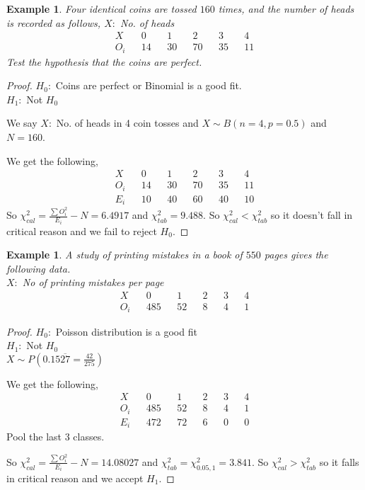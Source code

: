 \documentclass[oneside,11pt,pdftex]{book}%
\numberwithin{equation}{section}
\newtheorem{example}[theorem]{Example}
\numberwithin{section}{chapter}
\numberwithin{equation}{chapter}
\begin{document}
\begin{example}
	Four identical coins are tossed $ 160 $ times, and the number of heads is recorded as follows,
	$ X: $ No. of heads
	\begin{align*}
		X && 0 && 1 && 2 && 3 && 4\\
		O_i && 14 && 30 && 70 && 35 && 11
	\end{align*}
	Test the hypothesis that the coins are perfect.
\end{example}
\begin{proof}
	$ H_0: $ Coins are perfect or Binomial is a good fit.\\
	$ H_1: $ Not $ H_0 $
	
	We say $ X: $ No. of heads in 4 coin tosses and $ X \sim B(n=4,p=0.5) $ and $ N=160 $.
	
	We get the following,
	\begin{align*}
		X && 0 && 1 && 2 && 3 && 4\\
		O_i && 14 && 30 && 70 && 35 && 11\\
		E_i && 10 && 40 && 60 && 40 && 10
	\end{align*}
	So $ \chi^2_{cal} = \frac{\sum O_i^2}{E_i}-N=6.4917$ and $ \chi^2_{tab} = 9.488$. So $ \chi^2_{cal} < \chi^2_{tab}$ so it doesn't fall in critical reason and we fail to reject $ H_0 $.
\end{proof}

\begin{example}
	A study of printing mistakes in a book of $ 550 $ pages gives the following data.\\
	$ X: $ No of printing mistakes per page
	\begin{align*}
		X && 0 && 1 && 2 && 3 && 4\\
		O_i && 485 && 52 && 8 && 4 && 1
	\end{align*}
\end{example}
\begin{proof}
	$ H_0: $ Poisson distribution is a good fit\\
	$H_1:$ Not $ H_0 $\\
	$ X \sim P(0.15\overline{27}=\frac{42}{275}) $
	
	We get the following,
	\begin{align*}
		X && 0 && 1 && 2 && 3 && 4\\
		O_i && 485 && 52 && 8 && 4 && 1\\
		E_i && 472 && 72 && 6 && 0 && 0
	\end{align*}
	Pool the last 3 classes.
	
	
	So $ \chi^2_{cal} = \frac{\sum O_i^2}{E_i}-N=14.08027$ and $ \chi^2_{tab}=\chi^2_{0.05,1} = 3.841	$. So $ \chi^2_{cal} > \chi^2_{tab}$ so it falls in critical reason and we accept $ H_1 $.
\end{proof}
\end{document}
